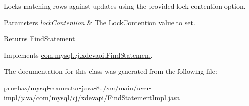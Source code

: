 Locks matching rows against updates using the provided lock contention option.


\begin{DoxyParams}{Parameters}
{\em lock\+Contention} & The \mbox{\hyperlink{}{Lock\+Contention}} value to set. \\
\hline
\end{DoxyParams}
\begin{DoxyReturn}{Returns}
\mbox{\hyperlink{interfacecom_1_1mysql_1_1cj_1_1xdevapi_1_1_find_statement}{Find\+Statement}} 
\end{DoxyReturn}


Implements \mbox{\hyperlink{interfacecom_1_1mysql_1_1cj_1_1xdevapi_1_1_find_statement_a462ecf53c1ba4a9d6e0d29a2a244bd62}{com.\+mysql.\+cj.\+xdevapi.\+Find\+Statement}}.



The documentation for this class was generated from the following file\+:\begin{DoxyCompactItemize}
\item 
pruebas/mysql-\/connector-\/java-\/8../src/main/user-\/impl/java/com/mysql/cj/xdevapi/\mbox{\hyperlink{_find_statement_impl_8java}{Find\+Statement\+Impl.\+java}}\end{DoxyCompactItemize}
